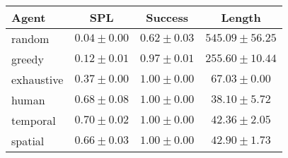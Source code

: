 \begin{tabular}{lccc}
    \toprule
    Agent & SPL & Success & Length \\
    \midrule
    random & $0.04 \pm 0.00$ & $0.62 \pm 0.03$ & $545.09 \pm 56.25$\\
    greedy & $0.12 \pm 0.01$ & $0.97 \pm 0.01$ & $255.60 \pm 10.44$\\
    exhaustive & $0.37 \pm 0.00$ & $1.00 \pm 0.00$ & $67.03 \pm 0.00$\\
    human & $0.68 \pm 0.08$ & $1.00 \pm 0.00$ & $38.10 \pm 5.72$\\
    temporal & $0.70 \pm 0.02$ & $1.00 \pm 0.00$ & $42.36 \pm 2.05$\\
    spatial & $0.66 \pm 0.03$ & $1.00 \pm 0.00$ & $42.90 \pm 1.73$\\
    \bottomrule
\end{tabular}